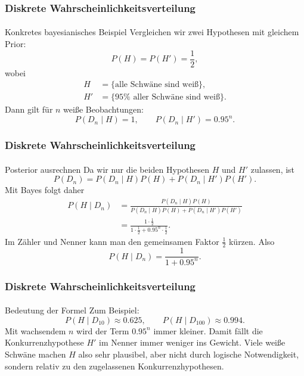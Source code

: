 \documentclass{beamer}
\begin{document}
\begin{frame}
    \frametitle{Diskrete Wahrscheinlichkeitsverteilung}
\framesubtitle{}

\begin{block}{Konkretes bayesianisches Beispiel}
Vergleichen wir zwei Hypothesen mit gleichem Prior:
\[
P(H)=P(H')=\frac12,
\]
wobei
\begin{align*}
H&=\{\text{alle Schwäne sind weiß}\}, \\
H'&=\{95\% \text{ aller Schwäne sind weiß}\}.
\end{align*}
Dann gilt für \(n\) weiße Beobachtungen:
\[
P(D_n \mid H)=1,
\qquad
P(D_n \mid H')=0.95^n.
\]
\end{block}

 \end{frame}


\begin{frame}
    \frametitle{Diskrete Wahrscheinlichkeitsverteilung}
\framesubtitle{}

\begin{block}{Posterior ausrechnen}
Da wir nur die beiden Hypothesen \(H\) und \(H'\) zulassen, ist
\[
P(D_n)=P(D_n \mid H)P(H)+P(D_n \mid H')P(H').
\]
Mit Bayes folgt daher
\begin{align*}
P(H \mid D_n)
&= \frac{P(D_n \mid H)P(H)}{P(D_n \mid H)P(H)+P(D_n \mid H')P(H')} \\
&= \frac{1 \cdot \frac12}{1 \cdot \frac12 + 0.95^n \cdot \frac12}.
\end{align*}
Im Zähler und Nenner kann man den gemeinsamen Faktor \(\frac12\) kürzen. Also
\[
P(H \mid D_n)
= \frac{1}{1+0.95^n}.
\]
\end{block}

 \end{frame}


\begin{frame}
    \frametitle{Diskrete Wahrscheinlichkeitsverteilung}
\framesubtitle{}

\begin{block}{Bedeutung der Formel}
Zum Beispiel:
\[
P(H \mid D_{10}) \approx 0.625,
\qquad
P(H \mid D_{100}) \approx 0.994.
\]
Mit wachsendem \(n\) wird der Term \(0.95^n\) immer kleiner.
Damit fällt die Konkurrenzhypothese \(H'\) im Nenner immer weniger ins Gewicht.
Viele weiße Schwäne machen \(H\) also sehr plausibel, aber nicht durch logische Notwendigkeit, sondern relativ zu den zugelassenen Konkurrenzhypothesen.
\end{block}

 \end{frame}
\end{document}
